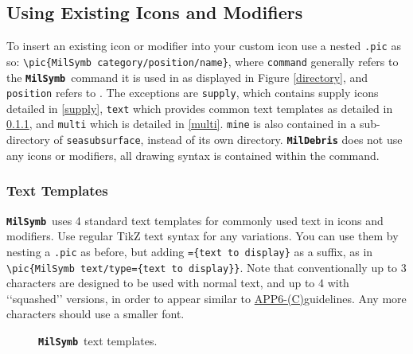\documentclass[a4paper, titlepage]{article}
\newcommand\MilSymb{\textbf{\texttt{MilSymb}}}
\newcommand\DocLink{\href{https://web.archive.org/web/20150921231042/http://armawiki.zumorc.de/files/NATO/APP-6(C).pdf}{APP6-(C)}}
\begin{document}
\subsection{Using Existing Icons and Modifiers}

To insert an existing icon or modifier into your custom icon use a nested \texttt{.pic} as so: \texttt{\textbackslash pic\{MilSymb category/position/name\}}, where \texttt{command} generally refers to the \MilSymb\  command it is used in as displayed in Figure \ref{directory}, and \texttt{position} refers to . The exceptions are \texttt{supply}, which contains supply icons detailed in \ref{supply}, \texttt{text} which provides common text templates as detailed in \ref{text}, and \texttt{multi} which is detailed in \ref{multi}. \texttt{mine} is also contained in a sub-directory of \texttt{seasubsurface}, instead of its own directory. \texttt{\textbf{MilDebris}} does not use any icons or modifiers, all drawing syntax is contained within the command.

\subsubsection{Text Templates}
\label{text}

\MilSymb\  uses 4 standard text templates for commonly used text in icons and modifiers. Use regular TikZ text syntax for any variations. You can use them by nesting a \texttt{.pic} as before, but adding \texttt{=\{text to display\}} as a suffix, as in \texttt{\textbackslash pic\{MilSymb text/type=\{text to display\}\}}. Note that conventionally up to 3 characters are designed to be used with normal text, and up to 4 with \lq\lq{}squashed\rq\rq{} versions, in order to appear similar to \DocLink guidelines. Any more characters should use a smaller font.

\begin{figure}[H]
\centering
{}
\caption{\MilSymb\  text templates.}
\end{figure}
\end{document}
